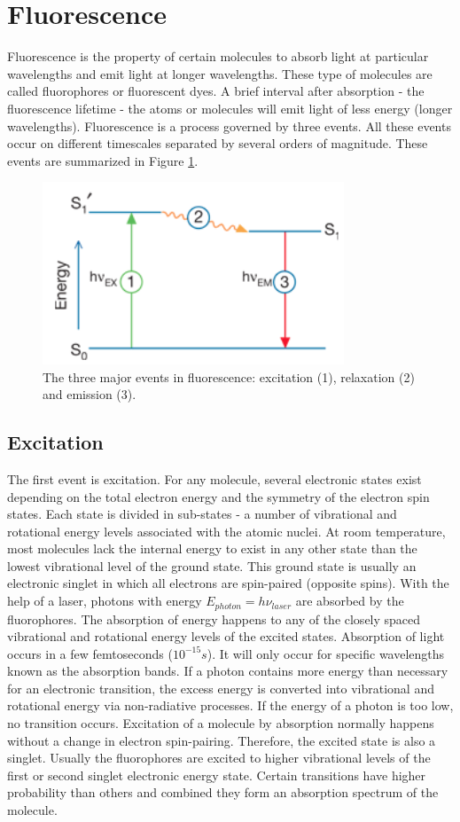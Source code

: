 \documentclass[twoside,single]{lion-msc}
\begin{document}
\section{Fluorescence}
Fluorescence is the property of certain molecules to absorb light at particular wavelengths and emit light at longer wavelengths. These type of molecules are called fluorophores or fluorescent dyes. A brief interval after absorption - the fluorescence lifetime - the atoms or molecules will emit light of less energy (longer wavelengths).  Fluorescence is a process governed by three events. All these events occur on different timescales separated by several orders of magnitude. These events are summarized in Figure \ref{fluor}.
\begin{figure}[ht!]
\centering
\includegraphics[width=90mm]{fluorescence.jpg}
\caption{The three major events in fluorescence: excitation (1), relaxation (2) and emission (3).} 
\label{fluor}
\end{figure}

\subsection{Excitation}
The first event is excitation. For any molecule, several electronic states exist depending on the total electron energy and the symmetry of the electron spin states. Each state is divided in sub-states - a number of vibrational and rotational energy levels associated with the atomic nuclei. At room temperature, most molecules lack the internal energy to exist in any other state than the lowest vibrational level of the ground state. This ground state is usually an electronic singlet in which all electrons are spin-paired (opposite spins). With the help of a laser, photons with energy $E_{photon}=h \nu_{laser}$ are absorbed by the fluorophores. The absorption of energy happens to any of the closely spaced vibrational and rotational energy levels of the excited states. Absorption of light occurs in a few femtoseconds ($10^{-15}s$). It will only occur for specific wavelengths known as the absorption bands. If a photon contains more energy than necessary for an electronic transition, the excess energy is converted into vibrational and rotational energy via non-radiative processes. If the energy of a photon is too low, no transition occurs. Excitation of a molecule by absorption normally happens without a change in electron spin-pairing. Therefore, the excited state is also a singlet. Usually the fluorophores are excited to higher vibrational levels of the first or second singlet electronic energy state. Certain transitions have higher probability than others and combined they form an absorption spectrum of the molecule.
\end{document}
